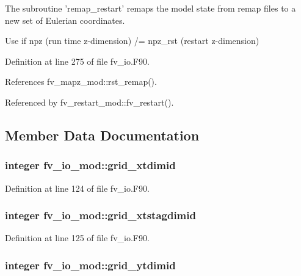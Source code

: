 The subroutine 'remap\-\_\-restart' remaps the model state from remap files to a new set of Eulerian coordinates. 

Use if npz (run time z-\/dimension) /= npz\-\_\-rst (restart z-\/dimension) 

Definition at line 275 of file fv\-\_\-io.\-F90.



References fv\-\_\-mapz\-\_\-mod\-::rst\-\_\-remap().



Referenced by fv\-\_\-restart\-\_\-mod\-::fv\-\_\-restart().



\subsection{Member Data Documentation}
\subsubsection[{grid\-\_\-xtdimid}]{\setlength{\rightskip}{0pt plus 5cm}integer fv\-\_\-io\-\_\-mod\-::grid\-\_\-xtdimid\hspace{0.3cm}{\ttfamily [private]}}\label{classfv__io__mod_a917a64d0d43975d4b5cc97fd73f73443}


Definition at line 124 of file fv\-\_\-io.\-F90.

\subsubsection[{grid\-\_\-xtstagdimid}]{\setlength{\rightskip}{0pt plus 5cm}integer fv\-\_\-io\-\_\-mod\-::grid\-\_\-xtstagdimid\hspace{0.3cm}{\ttfamily [private]}}\label{classfv__io__mod_a0a6f309e19451cffeccc7a6dbffb4ffc}


Definition at line 125 of file fv\-\_\-io.\-F90.

\subsubsection[{grid\-\_\-ytdimid}]{\setlength{\rightskip}{0pt plus 5cm}integer fv\-\_\-io\-\_\-mod\-::grid\-\_\-ytdimid\hspace{0.3cm}{\ttfamily [private]}}\label{classfv__io__mod_a08db0ecb707015eb437912010c574d64}


